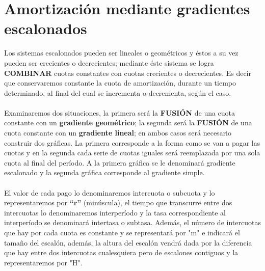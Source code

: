 	\section{Amortización mediante gradientes escalonados}
	Los sistemas escalonados pueden ser lineales o geométricos y éstos a su vez pueden ser crecientes o decrecientes; mediante éste sistema se logra \textbf{COMBINAR} cuotas constantes con cuotas crecientes o decrecientes. Es decir que conservaremos constante la cuota de amortización, durante un tiempo determinado, al final del cual se incrementa o decrementa, según el caso.\\\\
	Examinaremos dos situaciones, la primera será la \textbf{FUSIÓN} de una cuota constante con un \textbf{gradiente geométrico}; la segunda será la \textbf{FUSIÓN} de una cuota constante con un \textbf{gradiente lineal}; en ambos casos será necesario construir dos gráficas. La primera corresponde a la forma como se van a pagar las cuotas y en la segunda cada serie de cuotas iguales será reemplazada por una sola cuota al final del período. A la primera gráfica se le denominará gradiente escalonado y la segunda gráfica corresponde al gradiente simple.\\\\
	El valor de cada pago lo denominaremos intercuota o subcuota y lo representaremos por \textbf{“r”} (minúscula), el tiempo que transcurre entre dos intercuotas lo denominaremos interperíodo y la tasa correspondiente al interperíodo se denominará intertasa o subtasa. Además, el número de intercuotas que hay por cada cuota es constante y se representará por "m" e indicará el tamaño del escalón, además, la altura del escalón vendrá dada por la diferencia que hay entre dos intercuotas cualesquiera pero de escalones contiguos y la representaremos por "H".\\\\
	
	
